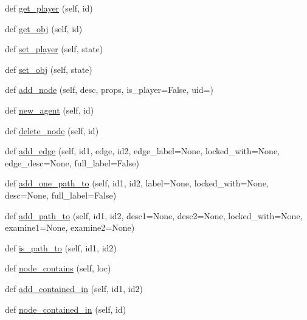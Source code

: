 \begin{DoxyCompactItemize}
\item 
def \hyperlink{classlight__chats_1_1graph_1_1Graph_a7f86299224bed2c821ed4ffa853cd669}{get\+\_\+player} (self, id)
\item 
def \hyperlink{classlight__chats_1_1graph_1_1Graph_ad965678de8b784a4c1506a8814f39767}{get\+\_\+obj} (self, id)
\item 
def \hyperlink{classlight__chats_1_1graph_1_1Graph_a4130e8f504f9a6eeafbc83a8a38a6efb}{set\+\_\+player} (self, state)
\item 
def \hyperlink{classlight__chats_1_1graph_1_1Graph_ac46849fddce61ce035feb6ea683b9009}{set\+\_\+obj} (self, state)
\item 
def \hyperlink{classlight__chats_1_1graph_1_1Graph_a5356cdaf2e48b3a128773c70957cb38a}{add\+\_\+node} (self, desc, props, is\+\_\+player=False, uid=\textquotesingle{}\textquotesingle{})
\item 
def \hyperlink{classlight__chats_1_1graph_1_1Graph_ad9d86fc2b41fef8960a90b517d80cd81}{new\+\_\+agent} (self, id)
\item 
def \hyperlink{classlight__chats_1_1graph_1_1Graph_a703188eb5340371b8ad793ddebd2af30}{delete\+\_\+node} (self, id)
\item 
def \hyperlink{classlight__chats_1_1graph_1_1Graph_ab343f587ca9bf3b7576fbe93e537dbca}{add\+\_\+edge} (self, id1, edge, id2, edge\+\_\+label=None, locked\+\_\+with=None, edge\+\_\+desc=None, full\+\_\+label=False)
\item 
def \hyperlink{classlight__chats_1_1graph_1_1Graph_ae7da5d306e949414cc4df9d49bc0678d}{add\+\_\+one\+\_\+path\+\_\+to} (self, id1, id2, label=None, locked\+\_\+with=None, desc=None, full\+\_\+label=False)
\item 
def \hyperlink{classlight__chats_1_1graph_1_1Graph_a4335de6c1c70dbbab982149a5c1e1586}{add\+\_\+path\+\_\+to} (self, id1, id2, desc1=None, desc2=None, locked\+\_\+with=None, examine1=None, examine2=None)
\item 
def \hyperlink{classlight__chats_1_1graph_1_1Graph_a04cfd7a5cc3c2df0c1bfec920d89d84c}{is\+\_\+path\+\_\+to} (self, id1, id2)
\item 
def \hyperlink{classlight__chats_1_1graph_1_1Graph_aaf9882eb0e887eadf75e4f2460732c05}{node\+\_\+contains} (self, loc)
\item 
def \hyperlink{classlight__chats_1_1graph_1_1Graph_a764ec9d5d95e071d857644b1947a2385}{add\+\_\+contained\+\_\+in} (self, id1, id2)
\item 
def \hyperlink{classlight__chats_1_1graph_1_1Graph_a6afbdb89ba9db7f792506d9171f9e287}{node\+\_\+contained\+\_\+in} (self, id)

\end{DoxyCompactItemize}
